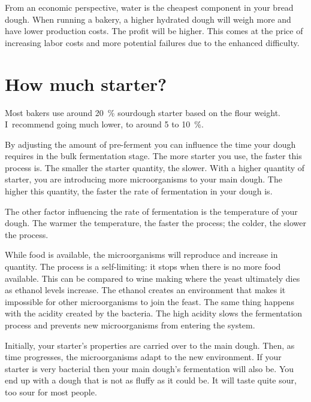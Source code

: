 From an economic perspective, water is the cheapest component in your bread
dough. When running a bakery, a higher hydrated dough will weigh more and have
lower production costs. The profit will be higher. This comes at the price
of increasing labor costs and more potential failures due to the enhanced
difficulty.

\section{How much starter?}

Most bakers use around \qty{20}{\percent} sourdough starter based on the
flour weight.  I~recommend going much lower,
to around 5 to \qty{10}{\percent}.

By adjusting the amount of pre-ferment you can influence the time your dough
requires in the bulk fermentation stage. The more starter you use, the faster
this process is. The smaller the starter quantity, the slower. With a higher
quantity of starter, you are introducing more microorganisms to your main
dough. The higher this quantity, the faster the rate of fermentation in your
dough is.

The other factor influencing the rate of fermentation is the temperature of
your dough. The warmer the temperature, the faster the process; the colder, the
slower the process.

While food is available, the microorganisms will reproduce and increase in
quantity. The process is a self-limiting: it stops when there is no
more food available. This can be compared to wine making where
the yeast ultimately dies as ethanol levels increase. The ethanol creates an
environment that makes it impossible for other
microorganisms to join the feast. The same thing happens with the acidity
created by the bacteria. The high acidity slows the fermentation process and
prevents new microorganisms from entering the system.

Initially, your starter's properties are carried over to the main dough. Then,
as time progresses, the microorganisms adapt to the new environment. If your
starter is very bacterial then your main dough's fermentation will also be. You
end up with a dough that is not as fluffy as it could be. It will taste quite
sour, too sour for most people.

